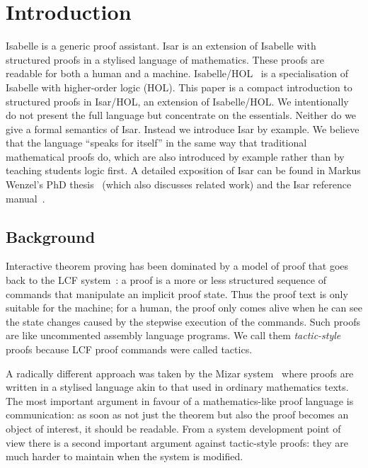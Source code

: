 \section{Introduction}

Isabelle is a generic proof assistant.  Isar is an extension of
Isabelle with structured proofs in a stylised language of mathematics.
These proofs are readable for both a human and a machine.
Isabelle/HOL~\cite{LNCS2283} is a specialisation of Isabelle with
higher-order logic (HOL). This paper is a compact introduction to
structured proofs in Isar/HOL, an extension of Isabelle/HOL. We
intentionally do not present the full language but concentrate on the
essentials. Neither do we give a formal semantics of Isar. Instead we
introduce Isar by example. We believe that the language ``speaks for
itself'' in the same way that traditional mathematical proofs do,
which are also introduced by example rather than by teaching students
logic first. A detailed exposition of Isar can be found in Markus
Wenzel's PhD thesis~\cite{Wenzel-PhD} (which also discusses related
work) and the Isar reference manual~\cite{Isar-Ref-Man}.

\subsection{Background}

Interactive theorem proving has been dominated by a model of proof
that goes back to the LCF system~\cite{LCF}: a proof is a more or less
structured sequence of commands that manipulate an implicit proof
state. Thus the proof text is only suitable for the machine; for a
human, the proof only comes alive when he can see the state changes
caused by the stepwise execution of the commands. Such proofs are like
uncommented assembly language programs. We call them
\emph{tactic-style} proofs because LCF proof commands were called
tactics.

A radically different approach was taken by the Mizar
system~\cite{Rudnicki92} where proofs are written in a stylised language akin
to that used in ordinary mathematics texts. The most important argument in
favour of a mathematics-like proof language is communication: as soon as not
just the theorem but also the proof becomes an object of interest, it should
be readable.  From a system development point of view there is a second
important argument against tactic-style proofs: they are much harder to
maintain when the system is modified.

